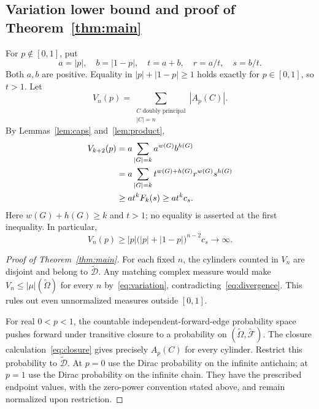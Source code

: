 \documentclass[11pt]{article}
\theoremstyle{definition}
\newcommand{\Om}{\widetilde\Omega}
\newcommand{\F}{\widetilde{\mathcal F}}
\newcommand{\D}{\widetilde{\mathcal D}}
\begin{document}
\subsection{Variation lower bound and proof of Theorem~\ref{thm:main}}
For $p\notin[0,1]$, put
\begin{equation}\label{eq:normalization}
 a=|p|,\quad b=|1-p|,\quad t=a+b,\quad r=a/t,\quad s=b/t.
\end{equation}
Both $a,b$ are positive. Equality in $|p|+|1-p|\ge1$ holds exactly for
$p\in[0,1]$, so $t>1$. Let
\begin{equation}\label{eq:V}
 V_n(p)=\sum_{\substack{C\text{ doubly principal}\\ |C|=n}}|A_p(C)|.
\end{equation}
By Lemmas~\ref{lem:caps} and~\ref{lem:product},
\begin{align}
 V_{k+2}(p)
 &=a\sum_{|G|=k}a^{w(G)}b^{h(G)}\notag\\
 &=a\sum_{|G|=k}t^{w(G)+h(G)}r^{w(G)}s^{h(G)}\notag\\
 &\ge a t^k F_k(s)\ge a t^k c_s.\label{eq:bound}
\end{align}
Here $w(G)+h(G)\ge k$ and $t>1$; no equality is asserted at the first
inequality. In particular,
\begin{equation}\label{eq:divergence}
 \boxed{V_n(p)\ge |p|\bigl(|p|+|1-p|\bigr)^{n-2}c_s
       \longrightarrow\infty.}
\end{equation}

\begin{proof}[Proof of Theorem~\ref{thm:main}]
For each fixed $n$, the cylinders counted in $V_n$ are disjoint and belong
to $\D$. Any matching complex measure would make $V_n\le|\mu|(\Om)$ for
every $n$ by~\eqref{eq:variation}, contradicting~\eqref{eq:divergence}.
This rules out even unnormalized measures outside $[0,1]$.

For real $0<p<1$, the countable independent-forward-edge probability space
pushes forward under transitive closure to a probability on $(\Om,\F)$.
The closure calculation~\eqref{eq:closure} gives precisely $A_p(C)$ for
every cylinder. Restrict this probability to $\D$. At $p=0$ use the Dirac
probability on the infinite antichain; at $p=1$ use the Dirac probability
on the infinite chain. They have the prescribed endpoint values, with the
zero-power convention stated above, and remain normalized upon restriction.
\end{proof}
\end{document}

